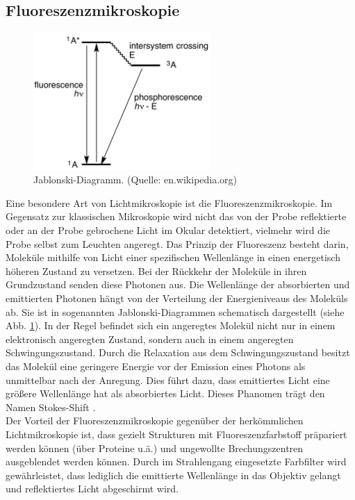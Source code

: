 \subsection{Fluoreszenzmikroskopie}
\begin{figure}
	\centering
	\includegraphics[width=0.6\textwidth]{plots/jablonski.png}
	\caption{Jablonski-Diagramm. (Quelle: en.wikipedia.org)}\label{fig:jablonski}
\end{figure}
Eine besondere Art von Lichtmikroskopie ist die Fluoreszenzmikroskopie.
Im Gegensatz zur klassischen Mikroskopie wird nicht das von der Probe reflektierte oder an der Probe gebrochene Licht im Okular detektiert, vielmehr wird die Probe selbst zum Leuchten angeregt.
Das Prinzip der Fluoreszenz besteht darin, Moleküle mithilfe von Licht einer spezifischen Wellenlänge in einen energetisch höheren Zustand zu versetzen. 
Bei der Rückkehr der Moleküle in ihren Grundzustand senden diese Photonen aus. 
Die Wellenlänge der absorbierten und emittierten Photonen hängt von der Verteilung der Energieniveaus des Moleküls ab. Sie ist in sogenannten Jablonski-Diagrammen schematisch dargestellt (siehe Abb. \ref{fig:jablonski}).
In der Regel befindet sich ein angeregtes Molekül nicht nur in einem elektronisch angeregten Zustand, sondern auch in einem angeregten Schwingungszustand.
Durch die Relaxation aus dem Schwingungszustand besitzt das Molekül eine geringere Energie vor der Emission eines Photons als unmittelbar nach der Anregung.
Dies führt dazu, dass emittiertes Licht eine größere Wellenlänge hat als absorbiertes Licht. Dieses Phanomen trägt den Namen Stokes-Shift \cite{haken}.
\\
Der Vorteil der Fluoreszenzmikroskopie gegenüber der herkömmlichen Lichtmikroskopie ist, dass gezielt Strukturen mit Fluoreszenzfarbstoff präpariert werden können (über Proteine u.ä.) und ungewollte Brechungszentren ausgeblendet werden können.
Durch im Strahlengang eingesetzte Farbfilter wird gewährleistet, dass lediglich die emittierte Wellenlänge in das Objektiv gelangt und reflektiertes Licht abgeschirmt wird.
